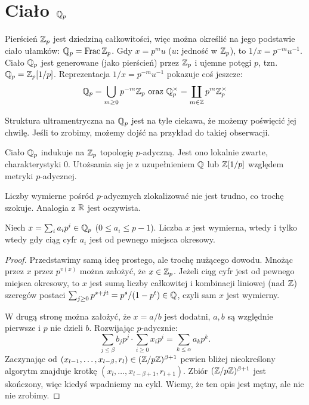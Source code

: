 \section{Ciało $\mathbb Q_p$}
Pierścień $\mathbb Z_p$ jest dziedziną całkowitości, więc można określić na jego podstawie ciało ułamków: $\mathbb Q_p = \operatorname{Frac} \mathbb Z_p$.
Gdy $x = p^m u$ ($u$: jedność w $\mathbb Z_p$), to $1/x = p^{-m} u^{-1}$.
Ciało $\mathbb Q_p$ jest generowane (jako pierścień) przez $\mathbb Z_p$ i ujemne potęgi $p$, tzn. $\mathbb Q_p = \mathbb Z_p[1/p]$.
Reprezentacja $1/x = p^{-m} u^{-1}$ pokazuje coś jeszcze:
\[
	\mathbb Q_p = \bigcup_{m \ge 0} p^{-m} \mathbb Z_p \mbox{ oraz } \mathbb Q_p^\times = \coprod_{m \in \mathbb Z} p^m \mathbb Z_p^\times
\]

Struktura ultramentryczna na $\mathbb Q_p$ jest na tyle ciekawa, że możemy poświęcić jej chwilę.
Jeśli to zrobimy, możemy dojść na przykład do takiej obserwacji.

\begin{fakt}
	Ciało $\mathbb Q_p$ indukuje na $\mathbb Z_p$ topologię $p$-adyczną.
	Jest ono lokalnie zwarte, charakterystyki $0$.
	Utożsamia się je z uzupełnieniem $\mathbb Q$ lub $\mathbb Z[1/p]$ względem metryki $p$-adycznej.
\end{fakt}

Liczby wymierne pośród $p$-adycznych zlokalizować nie jest trudno, co trochę szokuje.
Analogia z $\mathbb R$ jest oczywista.

\begin{fakt}
	Niech $x = \sum_i a_i p^i \in \mathbb Q_p$ ($0 \le a_i \le p-1$).
	Liczba $x$ jest wymierna, wtedy i tylko wtedy gdy ciąg cyfr $a_i$ jest od pewnego miejsca okresowy.
\end{fakt}

\begin{proof}
	Przedstawimy samą ideę prostego, ale trochę nużącego dowodu.
	Mnożąc przez $x$ przez $p^{v(x)}$ można założyć, że $x \in \mathbb Z_p$.
	Jeżeli ciąg cyfr jest od pewnego miejsca okresowy, to $x$ jest sumą liczby całkowitej i kombinacji liniowej (nad $\mathbb Z$) szeregów postaci $\sum_{j \ge 0} p^{s+jt} = p^s / (1-p^t) \in \mathbb Q$, czyli sam $x$ jest wymierny.

	W drugą stronę można założyć, że $x = a/b$ jest dodatni, $a, b$ są względnie pierwsze i $p$ nie dzieli $b$.
	Rozwijając $p$-adycznie:
	\[
		\sum_{j \le \beta} b_j p^j \cdot \sum_{i \ge 0} x_i p^i = \sum_{k \le \alpha} a_kp^k.
	\]
	Zaczynając od $(x_{l-1}, \dots, x_{l - \beta}, r_l) \in (\mathbb Z/p\mathbb Z)^{\beta + 1}$ pewien bliżej nieokreślony algorytm znajduje krotkę $(x_{l}, \dots, x_{l - \beta+1}, r_{l+1})$.
	Zbiór $(\mathbb Z/p\mathbb Z)^{\beta+1}$ jest skończony, więc kiedyś wpadniemy na cykl.
	Wiemy, że ten opis jest mętny, ale nic nie zrobimy.
\end{proof}

